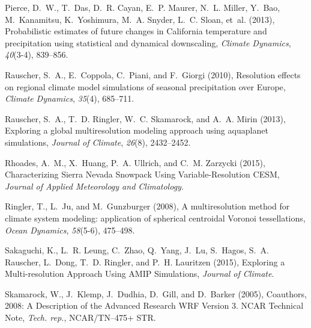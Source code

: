 \documentclass[ms,draft]{agutex}   %
\begin{document}
\begin{article}
\begin{thebibliography}{84}
Pierce, D.~W., T.~Das, D.~R. Cayan, E.~P. Maurer, N.~L. Miller, Y.~Bao,
  M.~Kanamitsu, K.~Yoshimura, M.~A. Snyder, L.~C. Sloan, et~al. (2013),
  {Probabilistic estimates of future changes in California temperature and
  precipitation using statistical and dynamical downscaling}, \textit{Climate
  Dynamics}, \textit{40}(3-4), 839--856.

Rauscher, S.~A., E.~Coppola, C.~Piani, and F.~Giorgi (2010), {Resolution
  effects on regional climate model simulations of seasonal precipitation over
  Europe}, \textit{Climate Dynamics}, \textit{35}(4), 685--711.

Rauscher, S.~A., T.~D. Ringler, W.~C. Skamarock, and A.~A. Mirin (2013),
  {Exploring a global multiresolution modeling approach using aquaplanet
  simulations}, \textit{Journal of Climate}, \textit{26}(8), 2432--2452.

Rhoades, A.~M., X.~Huang, P.~A. Ullrich, and C.~M. Zarzycki (2015),
  {Characterizing Sierra Nevada Snowpack Using Variable-Resolution CESM},
  \textit{Journal of Applied Meteorology and Climatology}.

Ringler, T., L.~Ju, and M.~Gunzburger (2008), {A multiresolution method for
  climate system modeling: application of spherical centroidal Voronoi
  tessellations}, \textit{Ocean Dynamics}, \textit{58}(5-6), 475--498.

Sakaguchi, K., L.~R. Leung, C.~Zhao, Q.~Yang, J.~Lu, S.~Hagos, S.~A. Rauscher,
  L.~Dong, T.~D. Ringler, and P.~H. Lauritzen (2015), {Exploring a
  Multi-resolution Approach Using AMIP Simulations}, \textit{Journal of
  Climate}.

Skamarock, W., J.~Klemp, J.~Dudhia, D.~Gill, and D.~Barker (2005), {Coauthors,
  2008: A Description of the Advanced Research WRF Version 3. NCAR Technical
  Note}, \textit{Tech. rep.}, NCAR/TN--475+ STR.


\end{thebibliography}
\end{article}
\end{document}
